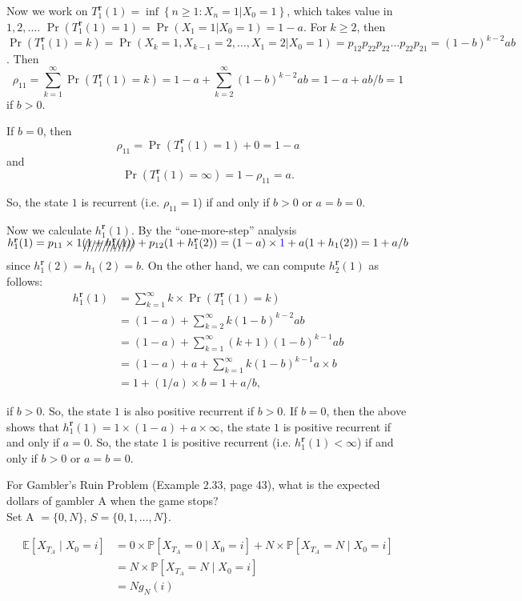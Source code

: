 \documentclass[  11pt]{article}
\newcommand{\p}{ {\Pr}}
\newcommand{\set}[1]{\left\{#1\right\}}
\newcommand{\rt}{{\textbf{r}}}
\begin{document}
\begin{ExerciseList}
\begin{enumerate}
Now we work on $T^\rt_1(1)=\inf\set{n\geq 1:  X_n =1\vert X_0=1}$,
which takes value in $1,2,\ldots$. 
$\p(T^\rt_1(1)=1)=\p(X_1=1 \vert X_0=1)=1-a$.
For $k\geq 2$, then 
$\p(T^\rt_1(1)=k)=\p(X_k=1, X_{k-1}=2,\ldots, X_1=2 \vert X_0=1)=
p_{12}p_{22}p_{22}\ldots p_{22}p_{21}=(1-b)^{k-2}ab$.
Then
\[\rho_{11}= \sum_{k=1}^\infty\p(T^\rt_1(1)=k)  =1-a + \sum_{k=2}^\infty  (1-b)^{k-2} ab=
1-a+ab /b =1 \]
if $b>0$.

If $b=0$, then $$\rho_{11}=   \p(T^\rt_1(1)=1) + 0 =1-a$$
and $$\p(T^\rt_1(1)=\infty)=1-\rho_{11}=a.$$

So, the state $1$ is recurrent (i.e. $\rho_{11}=1$) if and only if  $b>0 $ 
or $a=b=0$.

Now we calculate   $h^\rt_1(1)$.
By the ``one-more-step'' analysis
$h^\rt_1(1) = p_{11} \times 1 \xout{( 1+ h^\rt_1(1))} + p_{12} (1+h^\rt_1(2))
= (1-a) \times {\color{blue}{1}} + a (1+h_1(2))=1+a/b$
since $h^\rt_1(2)=h_1(2)=b$.
On the other hand, we can compute $h^\rt_2(1)$ as follows:
\[
\begin{split}
h^\rt_1(1) &= \sum_{k=1}^\infty k \times \p(T^\rt_1(1)=k)
\\
&=(1-a) + \sum_{k=2}^\infty  k(1-b)^{k-2} ab
\\
&=(1-a) + \sum_{k=1}^\infty  (k+1)(1-b)^{k-1} ab
\\
&=(1-a) + a + \sum_{k=1}^\infty  k(1-b)^{k-1} a\times b
\\
&=1  + (1/a) \times b = 1+a/b,
\end{split}
\]
\end{enumerate}
if $b>0$.
So, the state $1$ is also positive recurrent if $b>0$.
If $b=0$, then the above shows that $h^{\rt}_1(1)=1\times (1-a) +a\times \infty $, the state $1$
is  positive recurrent if and only if $a=0$.
So,
 the state $1$ is positive recurrent (i.e. $h^\rt_{1}(1)<\infty$) if and only if  $b>0 $ 
or $a=b=0$.



\Exercise
For Gambler's Ruin Problem (Example 2.33, page 43), what is the expected dollars of gambler A when the game stops?\\

\Answer
 Set A $ = \{0,N\}$, $S  = \{0,1,\dots, N\}$.\par
\[\begin{split}
\mathbb{E}[X_{T_A} \mid X_0 = i] %
& = 0\times \mathbb{P}[X_{T_A} = 0 \mid X_0 = i] + N\times \mathbb{P}[X_{T_A} = N \mid X_0 = i] \\
& = N\times \mathbb{P}[X_{T_A} = N \mid X_0 = i] \\
& = N g_{N}(i) 
\end{split}\]


\end{ExerciseList}
\end{document}
